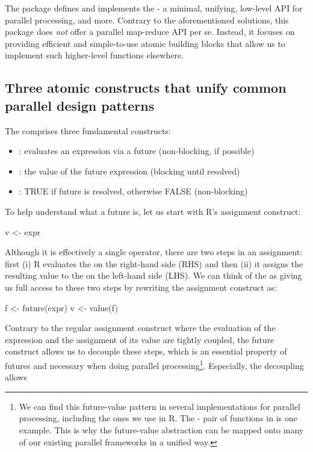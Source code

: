 The  package defines and implements the  -
a minimal, unifying, low-level API for parallel processing, and more.
Contrary to the aforementioned solutions, this package does \emph{not}
offer a parallel map-reduce API per se.  Instead, it focuses on
providing efficient and simple-to-use atomic building blocks that
allow us to implement such higher-level functions elsewhere.


\subsection{Three atomic constructs that unify common parallel design patterns}
\label{low-level-generalized-parallelization-model}

\begin{samepage}
The  comprises three fundamental constructs:
\begin{itemize}
\item
   : evaluates an expression via a
  future (non-blocking, if possible)
\item
   : the value of the future
  expression  (blocking until resolved)
\item
   : TRUE if future is resolved,
  otherwise FALSE (non-blocking)
\end{itemize}
\end{samepage}
%
To help understand what a future is, let us start with R's assignment
construct:
\begin{example}
v <- expr
\end{example}
Although it is effectively a single operator, there are two steps in
an assignment: first (i) R evaluates the  on the
right-hand side (RHS) and then (ii) it assigns the resulting value to
the  on the left-hand side (LHS).  We can think of
the  as giving us full access to these two steps by
rewriting the assignment construct as:
\begin{example}
f <- future(expr)
v <- value(f)
\end{example}
Contrary to the regular assignment construct where the evaluation of
the expression and the assignment of its value are tightly coupled,
the future construct allows us to decouple these steps, which is an
essential property of futures and necessary when doing parallel
processing\footnote{We can find this future-value pattern in several
implementations for parallel processing, including the ones we use in
R. The - pair of functions
in  is one example.  This is why the future-value
abstraction can be mapped onto many of our existing parallel
frameworks in a unified way.}.  Especially, the decoupling allows
